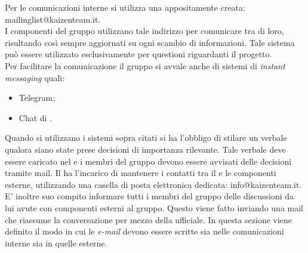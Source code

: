				Per  le comunicazioni interne si utilizza una  appositamente creata: mailinglist@kaizenteam.it.\\
				I componenti del gruppo utilizzano tale indirizzo per comunicare tra di loro, risultando così sempre aggiornati su ogni scambio di informazioni. Tale sistema può essere utilizzato esclusivamente per questioni riguardanti il progetto.\\
				Per facilitare la comunicazione il gruppo si avvale anche di sistemi di \textit{instant messaging} quali:
				\begin{itemize}
					\item Telegram;
					\item Chat di .
				\end{itemize}
				\begin{figure}[H]
					 \hspace{5mm}
				\end{figure}
				Quando si utilizzano i sistemi sopra citati si ha l'obbligo di stilare un verbale qualora siano state prese decisioni di importanza rilevante. Tale verbale deve essere caricato nel  e i membri del gruppo devono essere avvisati delle decisioni tramite mail.
				Il  ha l’incarico di mantenere i contatti tra il  e le componenti esterne, utilizzando una casella di posta elettronica dedicata: info@kaizenteam.it.\\
				E' inoltre suo compito informare tutti i membri del gruppo delle discussioni da lui avute con componenti esterni al gruppo. Questo viene fatto inviando una mail che riassume la conversazione per mezzo della  ufficiale.
				In questa sezione viene definito il modo in cui le \textit{e-mail} devono essere scritte sia nelle comunicazioni interne sia in quelle esterne.
